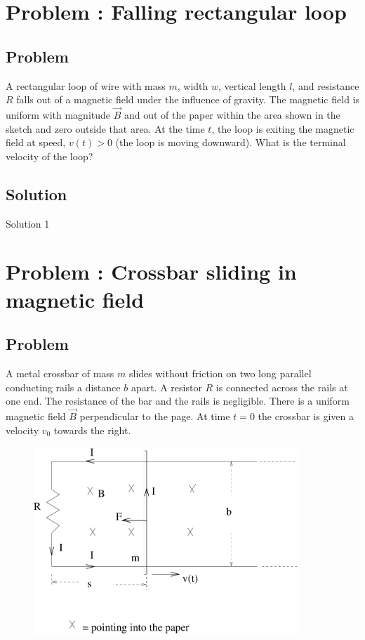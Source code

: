 \documentclass[solutions]{esg8022pset}
\date{\today }
\begin{document}
\section{Problem \thesection: Falling rectangular loop}
\subsection{Problem}
  A rectangular loop of wire with mass $m$, width $w$, vertical length $l$, and resistance $R$ falls out of a magnetic field under the influence of gravity. The magnetic field is uniform with magnitude $\vec{B}$ and out of the paper within the area shown in the sketch  and
   zero outside that area. At the time $t$, the loop is exiting the magnetic field at speed, $v(t) > 0$ (the loop is
moving downward). What is the terminal velocity of the loop?
\subsection{Solution}
  Solution 1
\section{Problem \thesection: Crossbar sliding in magnetic field}
\subsection{Problem}
A metal crossbar of mass $m$ slides without friction on two long parallel conducting rails a distance $b$ apart.
A resistor $R$ is connected across the rails at one end. The resistance of the bar and the rails is negligible.
There is a uniform magnetic field $\vec{B}$ perpendicular to the page. At time $t=0$ the crossbar is given a velocity
$v_0$ towards the right.

  \begin{figure}[H]
    \centering
    \includegraphics[width = 10cm]{faraday8}
    \label{fig:crossbar}
  \end{figure}
\end{document}
